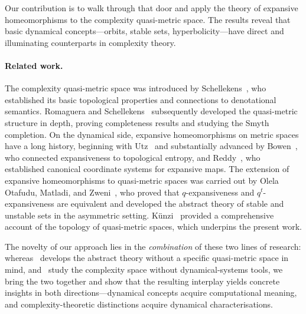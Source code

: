 \documentclass[11pt,a4paper]{article}
\theoremstyle{plain}
\theoremstyle{definition}
\begin{document}
Our contribution is to walk through that door and apply the theory of
expansive homeomorphisms to the complexity quasi-metric space.  The
results reveal that basic dynamical concepts---orbits, stable sets,
hyperbolicity---have direct and illuminating counterparts in
complexity theory.

\paragraph{Related work.}
The complexity quasi-metric space was introduced by
Schellekens~\cite{schellekens1995}, who established its basic
topological properties and connections to denotational semantics.
Romaguera and Schellekens~\cite{romaguera1999} subsequently
developed the quasi-metric structure in depth, proving
completeness results and studying the Smyth completion.  On
the dynamical side, expansive homeomorphisms on metric spaces
have a long history, beginning with Utz~\cite{utz1950} and
substantially advanced by Bowen~\cite{bowen1975}, who connected
expansiveness to topological entropy, and Reddy~\cite{reddy1983},
who established canonical coordinate systems for expansive maps.
The extension of expansive homeomorphisms to quasi-metric spaces
was carried out by Olela Otafudu, Matladi, and
Zweni~\cite{olela2024}, who proved that $q$-expansiveness and
$q^t$-expansiveness are equivalent and developed the abstract
theory of stable and unstable sets in the asymmetric setting.
K\"unzi~\cite{kunzi1995,kunzi2001} provided a comprehensive
account of the topology of quasi-metric spaces, which underpins
the present work.

The novelty of our approach lies in the \emph{combination} of
these two lines of research: whereas~\cite{olela2024} develops
the abstract theory without a specific quasi-metric space in mind,
and~\cite{schellekens1995,romaguera1999} study the complexity
space without dynamical-systems tools, we bring the two together
and show that the resulting interplay yields concrete insights
in both directions---dynamical concepts acquire computational
meaning, and complexity-theoretic distinctions acquire dynamical
characterisations.
\end{document}

